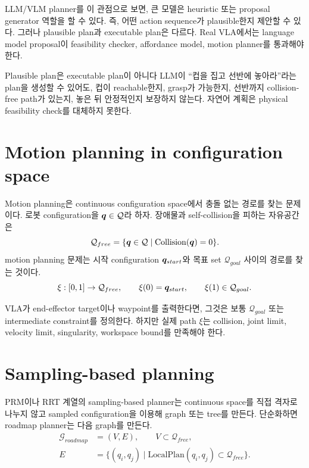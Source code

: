 LLM/VLM planner를 이 관점으로 보면, 큰 모델은 heuristic 또는 proposal generator 역할을 할 수 있다. 즉, 어떤 action sequence가 plausible한지 제안할 수 있다. 그러나 plausible plan과 executable plan은 다르다. Real VLA에서는 language model proposal이 feasibility checker, affordance model, motion planner를 통과해야 한다.

\begin{warningbox}{Plausible plan은 executable plan이 아니다}
LLM이 ``컵을 집고 선반에 놓아라''라는 plan을 생성할 수 있어도, 컵이 reachable한지, grasp가 가능한지, 선반까지 collision-free path가 있는지, 놓은 뒤 안정적인지 보장하지 않는다. 자연어 계획은 physical feasibility check를 대체하지 못한다.
\end{warningbox}

\section{Motion planning in configuration space}

Motion planning은 continuous configuration space에서 충돌 없는 경로를 찾는 문제이다. 로봇 configuration을 $\bm{q}\in\mathcal{Q}$라 하자. 장애물과 self-collision을 피하는 자유공간은
\begin{equation}
  \mathcal{Q}_{free}
  =
  \{\bm{q}\in\mathcal{Q}\mid \mathrm{Collision}(\bm{q})=0\}.
  \label{eq:q-free}
\end{equation}
motion planning 문제는 시작 configuration $\bm{q}_{start}$와 목표 set $\mathcal{Q}_{goal}$ 사이의 경로를 찾는 것이다.
\begin{equation}
  \xi:[0,1]\rightarrow \mathcal{Q}_{free},
  \qquad
  \xi(0)=\bm{q}_{start},
  \qquad
  \xi(1)\in\mathcal{Q}_{goal}.
  \label{eq:motion-planning-path}
\end{equation}

VLA가 end-effector target이나 waypoint를 출력한다면, 그것은 보통 $\mathcal{Q}_{goal}$ 또는 intermediate constraint를 정의한다. 하지만 실제 path $\xi$는 collision, joint limit, velocity limit, singularity, workspace bound를 만족해야 한다.

\section{Sampling-based planning}

PRM이나 RRT 계열의 sampling-based planner는 continuous space를 직접 격자로 나누지 않고 sampled configuration을 이용해 graph 또는 tree를 만든다. 단순화하면 roadmap planner는 다음 graph를 만든다.
\begin{equation}
  \begin{aligned}
  \mathcal{G}_{roadmap}&=(V,E),\qquad
  V\subset\mathcal{Q}_{free},\\
  E&=
  \{(q_i,q_j)\mid
  \mathrm{LocalPlan}(q_i,q_j)\subset\mathcal{Q}_{free}\}.
  \end{aligned}
  \label{eq:roadmap}
\end{equation}

